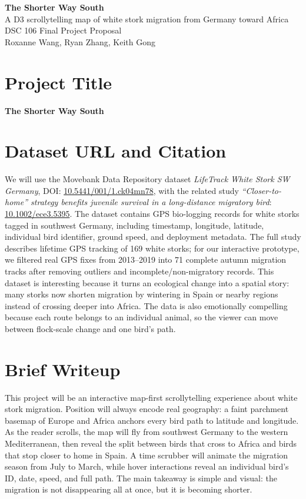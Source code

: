 \documentclass[11pt]{article}
\begin{document}
\begin{center}
{\Huge \bfseries The Shorter Way South}\\[0.35em]
{\Large A D3 scrollytelling map of white stork migration from Germany toward Africa}\\[0.75em]
{\color{muted} DSC 106 Final Project Proposal}\\[0.35em]
{\color{muted} Roxanne Wang, Ryan Zhang, Keith Gong}
\end{center}

\section{Project Title}
\textbf{The Shorter Way South}

\section{Dataset URL and Citation}
We will use the Movebank Data Repository dataset \textit{LifeTrack White Stork SW Germany}, DOI:
\href{https://doi.org/10.5441/001/1.ck04mn78}{10.5441/001/1.ck04mn78}, with the related study \textit{``Closer-to-home'' strategy benefits juvenile survival in a long-distance migratory bird}:
\href{https://doi.org/10.1002/ece3.5395}{10.1002/ece3.5395}. The dataset contains GPS bio-logging records for white storks tagged in southwest Germany, including timestamp, longitude, latitude, individual bird identifier, ground speed, and deployment metadata. The full study describes lifetime GPS tracking of 169 white storks; for our interactive prototype, we filtered real GPS fixes from 2013--2019 into 71 complete autumn migration tracks after removing outliers and incomplete/non-migratory records. This dataset is interesting because it turns an ecological change into a spatial story: many storks now shorten migration by wintering in Spain or nearby regions instead of crossing deeper into Africa. The data is also emotionally compelling because each route belongs to an individual animal, so the viewer can move between flock-scale change and one bird's path.

\section{Brief Writeup}
This project will be an interactive map-first scrollytelling experience about white stork migration. Position will always encode real geography: a faint parchment basemap of Europe and Africa anchors every bird path to latitude and longitude. As the reader scrolls, the map will fly from southwest Germany to the western Mediterranean, then reveal the split between birds that cross to Africa and birds that stop closer to home in Spain. A time scrubber will animate the migration season from July to March, while hover interactions reveal an individual bird's ID, date, speed, and full path. The main takeaway is simple and visual: the migration is not disappearing all at once, but it is becoming shorter.
\end{document}
